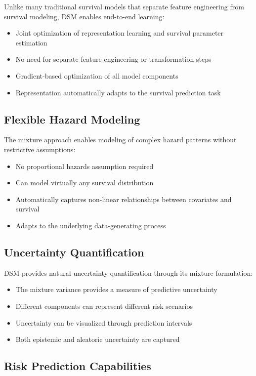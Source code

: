 Unlike many traditional survival models that separate feature engineering from survival modeling, DSM enables end-to-end learning:
\begin{itemize}
    \item Joint optimization of representation learning and survival parameter estimation
    \item No need for separate feature engineering or transformation steps
    \item Gradient-based optimization of all model components
    \item Representation automatically adapts to the survival prediction task
\end{itemize}

\subsection{Flexible Hazard Modeling}

The mixture approach enables modeling of complex hazard patterns without restrictive assumptions:
\begin{itemize}
    \item No proportional hazards assumption required
    \item Can model virtually any survival distribution
    \item Automatically captures non-linear relationships between covariates and survival
    \item Adapts to the underlying data-generating process
\end{itemize}

\subsection{Uncertainty Quantification}

DSM provides natural uncertainty quantification through its mixture formulation:
\begin{itemize}
    \item The mixture variance provides a measure of predictive uncertainty
    \item Different components can represent different risk scenarios
    \item Uncertainty can be visualized through prediction intervals
    \item Both epistemic and aleatoric uncertainty are captured
\end{itemize}

\subsection{Risk Prediction Capabilities}

